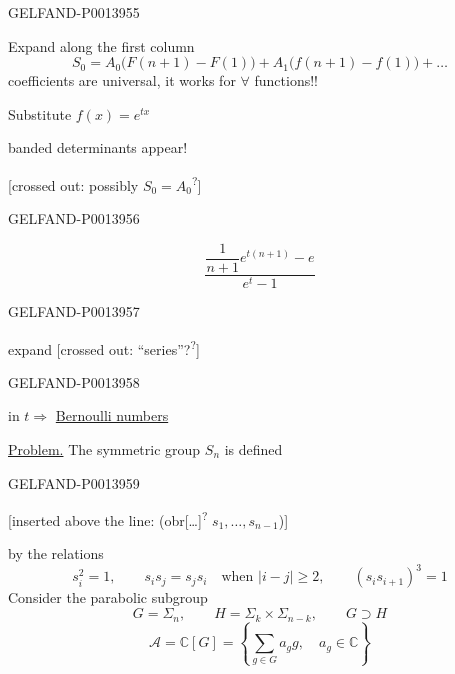\begin{GelfandAdjacentEvidence}{GELFAND-P001395}{5}


Expand along the first column
\[
S_0=A_0\bigl(F(n+1)-F(1)\bigr)
+A_1\bigl(f(n+1)-f(1)\bigr)+\ldots
\]
coefficients are universal, it works for \(\forall\) functions!!

Substitute \(f(x)=e^{tx}\)

banded determinants appear!

[crossed out:
possibly \(S_0=A_0\)\textsuperscript{?}]
\end{GelfandAdjacentEvidence}
\begin{GelfandAdjacentEvidence}{GELFAND-P001395}{6}

\[
\frac{\dfrac{1}{n+1}e^{t(n+1)}-e}{e^t-1}
\]
\end{GelfandAdjacentEvidence}
\begin{GelfandAdjacentEvidence}{GELFAND-P001395}{7}

expand [crossed out:
“series”?\textsuperscript{?}]
\end{GelfandAdjacentEvidence}
\begin{GelfandAdjacentEvidence}{GELFAND-P001395}{8}

in \(t\)\quad \(\Longrightarrow\) \uline{Bernoulli numbers}

\uline{Problem.} The symmetric group \(S_n\) is defined
\end{GelfandAdjacentEvidence}
\begin{GelfandAdjacentEvidence}{GELFAND-P001395}{9}

[inserted above the line: (obr[…]\textsuperscript{?} \(s_1,\ldots,s_{n-1}\))]
\end{GelfandAdjacentEvidence}

by the relations
\[
s_i^2=1,\qquad s_i s_j=s_j s_i\quad\text{when }\lvert i-j\rvert\ge2,
\qquad (s_i s_{i+1})^3=1
\]
Consider the parabolic subgroup
\[
G=\Sigma_n,\qquad H=\Sigma_k\times\Sigma_{n-k},\qquad G\supset H
\]
\[
\mathcal A=\mathbb C[G]=
\left\{\sum_{g\in G}a_g g,\quad a_g\in\mathbb C\right\}
\]


